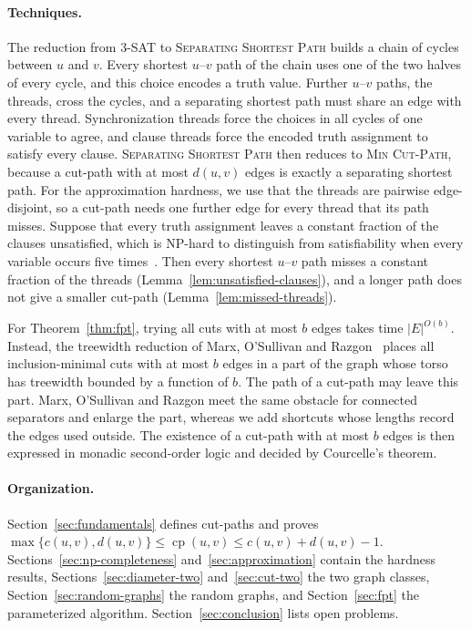 \documentclass[a4paper,fleqn]{cas-sc}
\numberwithin{equation}{section}
\theoremstyle{definition}
\theoremstyle{plain}
\theoremstyle{remark}
\newcommand{\cp}{\operatorname{cp}}                  %
\newcommand{\MinCutPath}{\textsc{Min Cut-Path}}
\newcommand{\SSP}{\textsc{Separating Shortest Path}}
\newcommand{\ThreeSAT}{\textsc{3-SAT}}
\begin{document}
\paragraph{Techniques.}
The reduction from \ThreeSAT{} to \SSP{} builds a chain of cycles between $u$ and $v$.
Every shortest $u$--$v$ path of the chain uses one of the two halves of every cycle, and this choice encodes a truth value.
Further $u$--$v$ paths, the threads, cross the cycles, and a separating shortest path must share an edge with every thread.
Synchronization threads force the choices in all cycles of one variable to agree, and clause threads force the encoded truth assignment to satisfy every clause.
\SSP{} then reduces to \MinCutPath{}, because a cut-path with at most $d(u,v)$ edges is exactly a separating shortest path.
For the approximation hardness, we use that the threads are pairwise edge-disjoint, so a cut-path needs one further edge for every thread that its path misses.
Suppose that every truth assignment leaves a constant fraction of the clauses unsatisfied, which is NP-hard to distinguish from satisfiability when every variable occurs five times~\cite{Feige1998Threshold}.
Then every shortest $u$--$v$ path misses a constant fraction of the threads (Lemma~\ref{lem:unsatisfied-clauses}), and a longer path does not give a smaller cut-path (Lemma~\ref{lem:missed-threads}).

For Theorem~\ref{thm:fpt}, trying all cuts with at most $b$ edges takes time $|E|^{O(b)}$.
Instead, the treewidth reduction of Marx, O'Sullivan and Razgon~\cite{Marx2013Separators} places all inclusion-minimal cuts with at most $b$ edges in a part of the graph whose torso has treewidth bounded by a function of $b$.
The path of a cut-path may leave this part.
Marx, O'Sullivan and Razgon meet the same obstacle for connected separators and enlarge the part, whereas we add shortcuts whose lengths record the edges used outside.
The existence of a cut-path with at most $b$ edges is then expressed in monadic second-order logic and decided by Courcelle's theorem.

\paragraph{Organization.}
Section~\ref{sec:fundamentals} defines cut-paths and proves $\max\{c(u,v), d(u,v)\} \leq \cp(u,v) \leq c(u,v) + d(u,v) - 1$.
Sections~\ref{sec:np-completeness} and~\ref{sec:approximation} contain the hardness results, Sections~\ref{sec:diameter-two} and~\ref{sec:cut-two} the two graph classes, Section~\ref{sec:random-graphs} the random graphs, and Section~\ref{sec:fpt} the parameterized algorithm.
Section~\ref{sec:conclusion} lists open problems.
\end{document}
